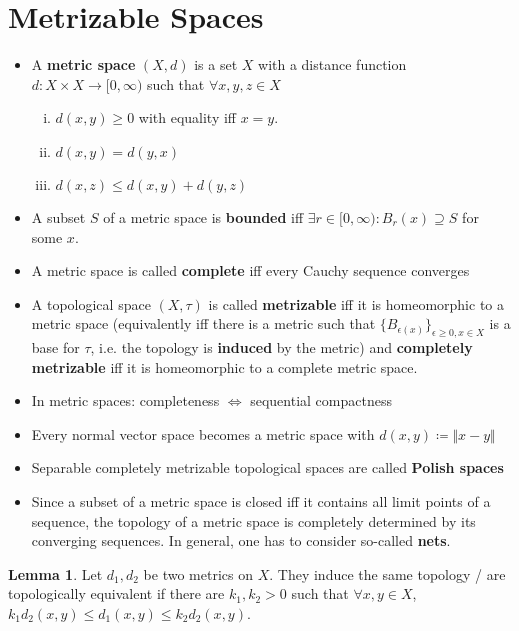 \documentclass[10pt,a4paper]{article}
\theoremstyle{definition}
\theoremstyle{cor}
\theoremstyle{theorem}
\theoremstyle{lemma}
\newtheorem{lemma}{Lemma}
\theoremstyle{example}
\begin{document}
\section{Metrizable Spaces}
\begin{itemize}
\item A \textbf{metric space} $(X, d)$ is a set $X$ with a distance function $d : X\times X \rightarrow [0, \infty)$ such that $\forall x, y, z \in X$
\begin{enumerate}[(i)]
\item $d(x, y) \geq 0$ with equality iff $x=y$.
\item $d(x, y) = d(y, x)$
\item $d(x, z) \leq d(x, y) + d(y, z)$ 
\end{enumerate} 
\item A subset $S$ of a metric space is \textbf{bounded} iff $\exists r\in[0, \infty) : B_{r}(x) \supseteq S$ for some $x$.
\item A metric space is called \textbf{complete} iff every Cauchy sequence converges
\item A topological space $(X, \tau)$ is called \textbf{metrizable} iff it is homeomorphic to a metric space (equivalently iff there is a metric such that $\{ B_{\epsilon(x)} \}_{\epsilon\geq 0, x \in X}$ is a base for $\tau$, i.e. the topology is \textbf{induced} by the metric) and \textbf{completely metrizable} iff it is homeomorphic to a complete metric space.
\end{itemize}

\begin{itemize}
\item In metric spaces: completeness $\Leftrightarrow$ sequential compactness
\item Every normal vector space becomes a metric space with $d(x, y) \coloneqq \Vert x - y\Vert$
\item Separable completely metrizable topological spaces are called \textbf{Polish spaces}
\item Since a subset of a metric space is closed iff it contains all limit points of a sequence, the topology of a metric space is completely determined by its converging sequences. In general, one has to consider so-called \textbf{nets}.
\end{itemize}

\begin{lemma}
Let $d_1, d_2$ be two metrics on $X$. They induce the same topology / are topologically equivalent if there are $k_1, k_2 > 0$ such that $\forall x, y \in X$, $k_1d_2(x, y) \leq d_1(x, y) \leq k_2 d_2 (x, y)$.
\end{lemma}
\end{document}
